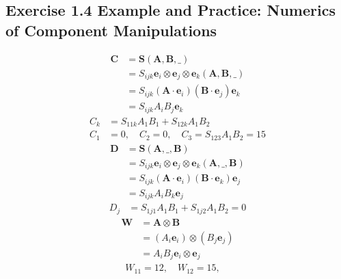\documentclass[10pt,a4paper]{book}
\theoremstyle{definition}
\begin{document}
\subsection{Exercise 1.4 Example and Practice: Numerics of Component Manipulations}
\begin{align}
    \mathbf{C}
    &=\mathbf{S}(\mathbf{A},\mathbf{B},\_)\\
    &=S_{ijk}\mathbf{e}_i\otimes\mathbf{e}_j\otimes\mathbf{e}_k(\mathbf{A},\mathbf{B},\_)\\
    &=S_{ijk}(\mathbf{A}\cdot\mathbf{e}_i)(\mathbf{B}\cdot\mathbf{e}_j)\mathbf{e}_k\\
    &=S_{ijk}A_iB_j\mathbf{e}_k
\end{align}
\begin{align}
    C_k&=S_{11k}A_1B_1+S_{12k}A_1B_2\\
    C_1&=0,\quad C_2=0,\quad C_3=S_{123}A_1B_2=15
\end{align}
\begin{align}
    \mathbf{D}
    &=\mathbf{S}(\mathbf{A},\_,\mathbf{B})\\
    &=S_{ijk}\mathbf{e}_i\otimes\mathbf{e}_j\otimes\mathbf{e}_k(\mathbf{A},\_,\mathbf{B})\\
    &=S_{ijk}(\mathbf{A}\cdot\mathbf{e}_i)(\mathbf{B}\cdot\mathbf{e}_k)\mathbf{e}_j\\
    &=S_{ijk}A_iB_k\mathbf{e}_j
\end{align}
\begin{align}
    D_j&=S_{1j1}A_1B_1 + S_{1j2}A_1B_2=0
\end{align}
\begin{align}
    \mathbf{W}
    &=\mathbf{A}\otimes\mathbf{B}\\
    &=(A_i\mathbf{e}_i)\otimes(B_j\mathbf{e}_j)\\
    &=A_iB_j \mathbf{e}_i\otimes\mathbf{e}_j
\end{align}
\begin{align}
    W_{11}=12,\quad W_{12}=15,\quad 
\end{align}
\end{document}

